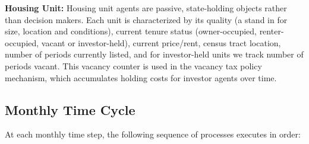 \documentclass[twocolumn,showpacs,%
  nofootinbib,aps,superscriptaddress,%
  eqsecnum,prd,notitlepage,showkeys,10pt]{revtex4-1}
\begin{document}
\textbf{Housing Unit:} Housing unit agents are passive, state-holding objects rather than decision makers. Each unit is characterized by its quality (a stand in for size, location and conditions), current tenure status (owner-occupied, renter-occupied, vacant or investor-held), current price/rent, census tract location, number of periods currently listed, and for investor-held units we track number of periods vacant. This vacancy counter is used in the vacancy tax policy mechanism, which accumulates holding costs for investor agents over time. \newline

\subsection{Monthly Time Cycle}
At each monthly time step, the following sequence of processes executes in order: \newline
\end{document}
